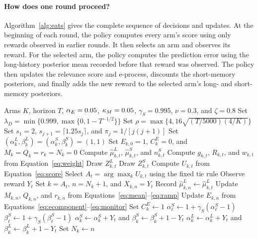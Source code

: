 \paragraph{How does one round proceed?}
Algorithm~\ref{alg:eats} gives the complete sequence of decisions and updates.
At the beginning of each round, the policy computes every arm's score using only rewards observed in earlier rounds.
It then selects an arm and observes its reward.
For the selected arm, the policy computes the prediction error using the long-history posterior mean recorded before that reward was observed.
The policy then updates the relevance score and e-process, discounts the short-memory posteriors, and finally adds the new reward to the selected arm's long- and short-memory posteriors.

\begin{algorithm}[H]
\caption{E-process-authorized Thompson sampling (\method{})}
\label{alg:eats}
\begin{algorithmic}[1]
\REQUIRE Arms $K$, horizon $T$, $\alpha_E=0.05$, $\kappa_M=0.05$,
$\gamma_S=0.995$, $\nu=0.3$, and $\zeta=0.8$
\STATE Set
$\lambda_D=\min\{0.999,\max\{0,1-T^{-1/2}\}\}$
\STATE Set
$\rho=\max\{4,16\sqrt{(T/5000)(4/K)}\}$
\STATE Set $s_1=2$, $s_{j+1}=\lceil1.25s_j\rceil$, and
$\pi_j=1/[j(j+1)]$
  \STATE Set
  $(\alpha^L_k,\beta^L_k)=(\alpha^S_k,\beta^S_k)=(1,1)$
  \STATE Set
  $E_{k,0}=1$, $C^E_k=0$, and $M_k=Q_k=r_k=N_k=0$
\ENDFOR
{}
    \STATE Compute $\widehat\mu^L_{k,t}$,
    $\widehat\mu^S_{k,t}$, and $n^S_{k,t}$
    \STATE Compute $g_{k,t}$, $R_{k,t}$, and $w_{k,t}$
    from Equation~\eqref{eq:weight}
    \STATE Draw $Z^L_{k,t}$
      \STATE Draw $Z^S_{k,t}$
    \ENDIF
    \STATE Compute $U_{k,t}$ from Equation~\eqref{eq:score}
  \ENDFOR
  \STATE Select $A_t=\arg\max_k U_{k,t}$ using the fixed tie rule
  \STATE Observe reward $Y_t$
  \STATE Set $k=A_t$, $n=N_k+1$, and $X_{k,n}=Y_t$
  \STATE Record
  $\widehat\mu^L_{k,n}\leftarrow\widehat\mu^L_{k,t}$
  \STATE Update $M_{k,n}$, $Q_{k,n}$, and $r_{k,n}$
  from Equations~\eqref{eq:mean}--\eqref{eq:ramp}
  \STATE Update $E_{k,n}$ from
  Equations~\eqref{eq:ecomponent}--\eqref{eq:monitor}
    \STATE Set $C^E_k\leftarrow1$
  \ENDIF
    \STATE
    $\alpha^S_\ell\leftarrow
    1+\gamma_S(\alpha^S_\ell-1)$
    \STATE
    $\beta^S_\ell\leftarrow
    1+\gamma_S(\beta^S_\ell-1)$
  \ENDFOR
  \STATE
  $\alpha^S_k\leftarrow\alpha^S_k+Y_t$
  and
  $\beta^S_k\leftarrow\beta^S_k+1-Y_t$
  \STATE
  $\alpha^L_k\leftarrow\alpha^L_k+Y_t$
  and
  $\beta^L_k\leftarrow\beta^L_k+1-Y_t$
  \STATE Set $N_k\leftarrow n$
\ENDFOR
\end{algorithmic}
\end{algorithm}

